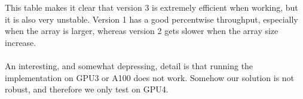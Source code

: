 This table makes it clear that version 3 is extremely efficient when working, but it is also very unstable.
Version 1 has a good percentwise throughput, especially when the array is larger, whereas version 2 gets slower when the array size increase.
\\~\\
An interesting, and somewhat depressing, detail is that running the implementation on GPU3 or A100 does not work. Somehow our solution is not robust, and therefore we only test on GPU4.









